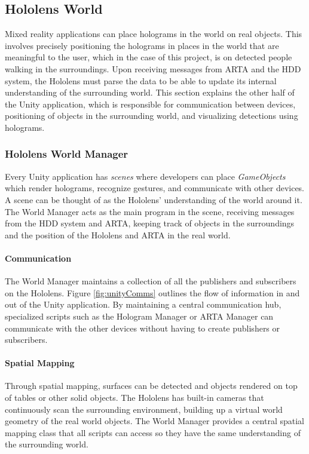 \subsection{Hololens World}
Mixed reality applications can place holograms in the world on real objects. This involves precisely positioning the holograms in places in the world that are meaningful to the user, which in the case of this project, is on detected people walking in the surroundings. Upon receiving messages from ARTA and the HDD system, the Hololens must parse the data to be able to update its internal understanding of the surrounding world. This section explains the other half of the Unity application, which is responsible for communication between devices, positioning of objects in the surrounding world, and visualizing detections using holograms.

\subsubsection{Hololens World Manager} \label{sec:holoworld}
Every Unity application has \textit{scenes} where developers can place \textit{GameObjects} which render holograms, recognize gestures, and communicate with other devices. A scene can be thought of as the Hololens' understanding of the world around it. The World Manager acts as the main program in the scene, receiving messages from the HDD system and ARTA, keeping track of objects in the surroundings and the position of the Hololens and ARTA in the real world.

\paragraph{Communication} The World Manager maintains a collection of all the publishers and subscribers on the Hololens. Figure \ref{fig:unityComms} outlines the flow of information in and out of the Unity application. By maintaining a central communication hub, specialized scripts such as the Hologram Manager or ARTA Manager can communicate with the other devices without having to create publishers or subscribers.

\paragraph{Spatial Mapping} Through spatial mapping, surfaces can be detected and objects rendered on top of tables or other solid objects. The Hololens has built-in cameras that continuously scan the surrounding environment, building up a virtual world geometry of the real world objects. The World Manager provides a central spatial mapping class that all scripts can access so they have the same understanding of the surrounding world.


